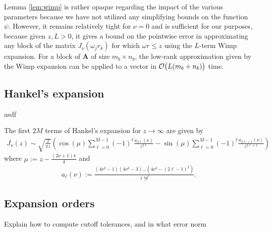 Lemma \ref{lem:wimp} is rather opaque regarding the impact of the various
parameters because we have not utilized any simplifying bounds on the function
$\psi$. However, it remains relatively tight for $\nu = 0$ and is sufficient for
our purposes, because given $z, L > 0$, it gives a bound on the pointwise error
in approximating any block of the matrix $J_\nu(\omega_j r_k)$ for which $\omega
r \leq z$ using the $L$-term Wimp expansion. For a block of $\bm{A}$ of size
$m_b \times n_b$, the low-rank approximation given by the Wimp expansion can be
applied to a vector in $\mathcal{O}\big(L(m_b + n_b)\big)$ time.




\subsection{Hankel's expansion}
\label{sec:asymptotic}
asdf

The first $2M$ terms of Hankel's expansion for $z \to \infty$ are given by
\begin{align} \label{eq:asymptotic-expansion}
    J_\nu(z)
    \sim \sqrt{\frac{2}{\pi z}} \left( 
        \cos\left(\mu\right) \sum_{\ell=0}^{M-1} (-1)^\ell \frac{a_{2\ell}(\nu)}{z^{2\ell}}
        - \sin\left(\mu\right) \sum_{\ell=0}^{M-1} (-1)^\ell \frac{a_{2\ell+1}(\nu)}{z^{2\ell+1}}
        \right)
\end{align}
where $\mu := z - \frac{(2\nu+1)\pi}{4}$ and 
\begin{align}
    a_\ell(\nu) := \frac{(4\nu^2 - 1)(4\nu^2 - 3)\dots(4\nu^2 - (2\ell-1)^2)}{\ell! 8^\ell}.
\end{align}







\subsection{Expansion orders}
\label{sec:cutoff}

Explain how to compute cutoff tolerances, and in what error norm



